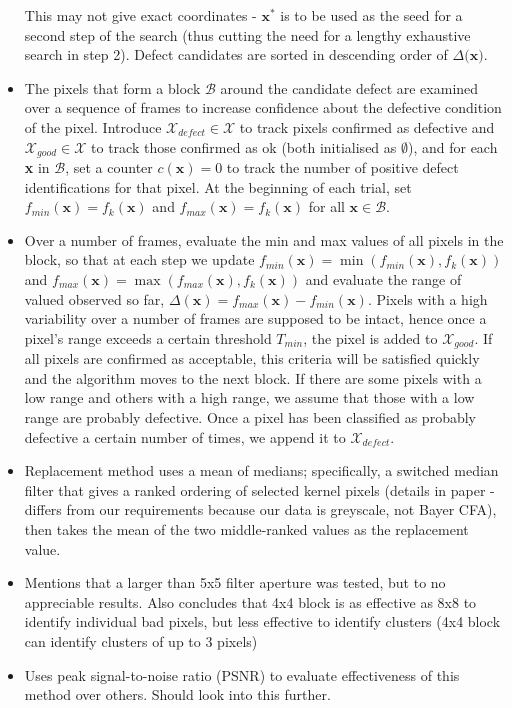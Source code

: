 \documentclass[10pt,fleqn]{article}
\begin{document}
\begin{itemize}
This may not give exact coordinates - $\textbf{x}^*$ is to be used as the seed for a second step of the search (thus cutting the need for a lengthy exhaustive search in step 2). Defect candidates are sorted in descending order of $\Delta(\textbf{x)}$.

\item The pixels that form a block $\mathcal{B}$ around the candidate defect are examined over a sequence of frames to increase confidence about the defective condition of the pixel. Introduce $\mathcal{X}_{defect} \in \mathcal{X}$ to track pixels confirmed as defective and $\mathcal{X}_{good} \in \mathcal{X}$ to track those confirmed as ok (both initialised as $\emptyset$), and for each \textbf{x} in $\mathcal{B}$, set a counter $c(\textbf{x}) = 0$ to track the number of positive defect identifications for that pixel. At the beginning of each trial, set $f_{min}(\textbf{x}) = f_k(\textbf{x})$ and $f_{max}(\textbf{x}) = f_k(\textbf{x})$ for all $\textbf{x} \in \mathcal{B}$.

\item Over a number of frames, evaluate the min and max values of all pixels in the block, so that at each step we update $f_{min}(\textbf{x}) = \min(f_{min}(\textbf{x}), f_k(\textbf{x}))$ and $f_{max}(\textbf{x}) = \max(f_{max}(\textbf{x}), f_k(\textbf{x}))$ and evaluate the range of valued observed so far, $\Delta(\textbf{x}) = f_{max}(\textbf{x}) - f_{min}(\textbf{x})$. Pixels with a high variability over a number of frames are supposed to be intact, hence once a pixel's range exceeds a certain threshold $T_{min}$, the pixel is added to $\mathcal{X}_{good}$. If all pixels are confirmed as acceptable, this criteria will be satisfied quickly and the algorithm moves to the next block. If there are some pixels with a low range and others with a high range, we assume that those with a low range are probably defective. Once a pixel has been classified as probably defective a certain number of times, we append it to $\mathcal{X}_{defect}$.

\item Replacement method uses a mean of medians; specifically, a switched median filter  that gives a ranked ordering of selected kernel pixels (details in paper - differs from our requirements because our data is greyscale, not Bayer CFA), then takes the mean of the two middle-ranked values as the replacement value.

\item Mentions that a larger than 5x5 filter aperture was tested, but to no appreciable results. Also concludes that 4x4 block is as effective as 8x8 to identify individual bad pixels, but less effective to identify clusters (4x4 block can identify clusters of up to 3 pixels)

\item Uses peak signal-to-noise ratio (PSNR) to evaluate effectiveness of this method over others. Should look into this further.

\end{itemize}
\end{document}

